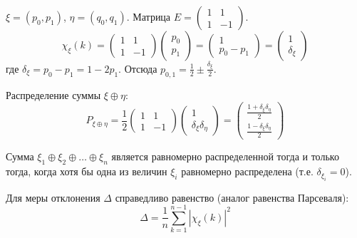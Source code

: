 \begin{example}[Пример для $n=2$]
$\xi = (p_0, p_1)$, $\eta = (q_0, q_1)$.
Матрица $E = \begin{pmatrix} 1 & 1 \\ 1 & -1 \end{pmatrix}$.
$$ \chi_\xi(k) = \begin{pmatrix} 1 & 1 \\ 1 & -1 \end{pmatrix} \begin{pmatrix} p_0 \\ p_1 \end{pmatrix} = \begin{pmatrix} 1 \\ p_0 - p_1 \end{pmatrix} = \begin{pmatrix} 1 \\ \delta_\xi \end{pmatrix} $$
где $\delta_\xi = p_0 - p_1 = 1 - 2p_1$. Отсюда $p_{0,1} = \frac{1}{2} \pm \frac{\delta_\xi}{2}$.

Распределение суммы $\xi \oplus \eta$:
$$ P_{\xi \oplus \eta} = \frac{1}{2} \begin{pmatrix} 1 & 1 \\ 1 & -1 \end{pmatrix} \begin{pmatrix} 1 \\ \delta_\xi \delta_\eta \end{pmatrix} = \begin{pmatrix} \frac{1 + \delta_\xi \delta_\eta}{2} \\ \frac{1 - \delta_\xi \delta_\eta}{2} \end{pmatrix} $$
\end{example}

\begin{theorem}
Сумма $\xi_1 \oplus \xi_2 \oplus \dots \oplus \xi_n$ является равномерно распределенной тогда и только тогда, когда хотя бы одна из величин $\xi_i$ равномерно распределена (т.е. $\delta_{\xi_i} = 0$).
\end{theorem}

\begin{statement}
Для меры отклонения $\Delta$ справедливо равенство (аналог равенства Парсеваля):
$$ \Delta = \frac{1}{n} \sum_{k=1}^{n-1} |\chi_\xi(k)|^2 $$
\end{statement}
